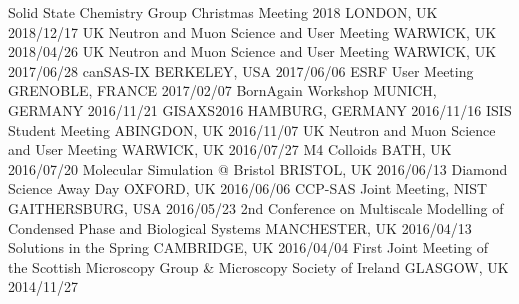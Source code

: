 {}
\begin{cvhonors}
  \cvhonornb
    {Solid State Chemistry Group Christmas Meeting 2018}
    {LONDON, UK}
    {2018/12/17}
  \cvhonornb
    {UK Neutron and Muon Science and User Meeting}
    {WARWICK, UK}
    {2018/04/26}
  \cvhonornb
    {UK Neutron and Muon Science and User Meeting}
    {WARWICK, UK}
    {2017/06/28}
  \cvhonornb
    {canSAS-IX}
    {BERKELEY, USA}
    {2017/06/06}
  \cvhonornb
    {ESRF User Meeting}
    {GRENOBLE, FRANCE}
    {2017/02/07}
  \cvhonornb
    {BornAgain Workshop}
    {MUNICH, GERMANY}
    {2016/11/21}
  \cvhonornb
    {GISAXS2016}
    {HAMBURG, GERMANY}
    {2016/11/16}
  \cvhonornb
    {ISIS Student Meeting}
    {ABINGDON, UK}
    {2016/11/07}
  \cvhonornb
    {UK Neutron and Muon Science and User Meeting}
    {WARWICK, UK}
    {2016/07/27}
  \cvhonornb
    {M4 Colloids}
    {BATH, UK}
    {2016/07/20}
  \cvhonornb
    {Molecular Simulation @ Bristol}
    {BRISTOL, UK}
    {2016/06/13}
  \cvhonornb
    {Diamond Science Away Day}
    {OXFORD, UK}
    {2016/06/06}
  \cvhonornb
    {CCP-SAS Joint Meeting, NIST}
    {GAITHERSBURG, USA}
    {2016/05/23}
  \cvhonornb
    {2nd Conference on Multiscale Modelling of Condensed Phase and Biological Systems}
    {MANCHESTER, UK}
    {2016/04/13}
  \cvhonornb
    {Solutions in the Spring}
    {CAMBRIDGE, UK}
    {2016/04/04}
  \cvhonornb
    {First Joint Meeting of the Scottish Microscopy Group \& Microscopy Society of Ireland}
    {GLASGOW, UK}
    {2014/11/27}
\end{cvhonors}
